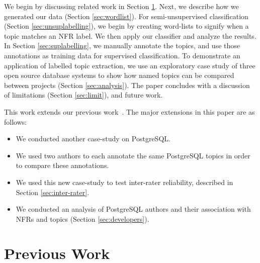 \documentclass[smallextended]{svjour3}       %
\begin{document}
We begin by discussing related work in Section \ref{sec:related}.
Next, we describe how we generated our data (Section \ref{sec:wordlist}). For semi-unsupervised classification (Section \ref{sec:unsuplabelling}), we
begin by creating word-lists to signify when a topic matches an NFR label. We then apply our classifier and analyze the results. 
In Section \ref{sec:suplabelling}, we manually annotate the topics, and use those annotations as training data for supervised classification.  
To demonstrate an application of labelled topic extraction, we use an exploratory case study of three open source database systems to show how named
topics can be compared between projects  (Section \ref{sec:analysis}). 
The paper concludes with a discussion of limitations (Section \ref{sec:limit}), and future work.

This work extends our previous work~\cite{msr2011}. The major extensions in this paper are as follows:
\begin{itemize}
	\item We conducted another case-study on PostgreSQL. 
	\item We used two authors to each annotate the same PostgreSQL topics in order to compare
these annotations. 
	\item We used this new case-study to test inter-rater reliability, described in Section \ref{sec:inter-rater}. 
	\item We conducted an analysis of PostgreSQL authors and their association with NFRs and
topics (Section \ref{sec:developers}).
\end{itemize}

\section{Previous Work}
\label{sec:related}
\end{document}
